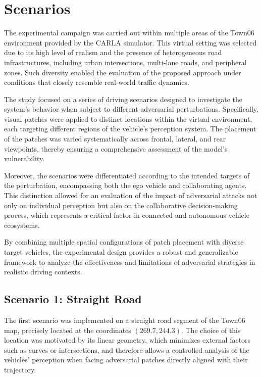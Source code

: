 \section{Scenarios}

The experimental campaign was carried out within multiple areas of the Town06 environment provided by the CARLA simulator.  
This virtual setting was selected due to its high level of realism and the presence of heterogeneous road infrastructures, including urban intersections, multi-lane roads, and peripheral zones. Such diversity enabled the evaluation of the proposed approach under conditions that closely resemble real-world traffic dynamics.

The study focused on a series of driving scenarios designed to investigate the system’s behavior when subject to different adversarial perturbations. Specifically, visual patches were applied to distinct locations within the virtual environment, each targeting different regions of the vehicle’s perception system. The placement of the patches was varied systematically across frontal, lateral, and rear viewpoints, thereby ensuring a comprehensive assessment of the model’s vulnerability.

Moreover, the scenarios were differentiated according to the intended targets of the perturbation, encompassing both the ego vehicle and collaborating agents. This distinction allowed for an evaluation of the impact of adversarial attacks not only on individual perception but also on the collaborative decision-making process, which represents a critical factor in connected and autonomous vehicle ecosystems.

By combining multiple spatial configurations of patch placement with diverse target vehicles, the experimental design provides a robust and generalizable framework to analyze the effectiveness and limitations of adversarial strategies in realistic driving contexts.

\subsection{Scenario 1: Straight Road}

The first scenario was implemented on a straight road segment of the Town06 map, precisely located at the coordinates $(269.7, 244.3)$.  
The choice of this location was motivated by its linear geometry, which minimizes external factors such as curves or intersections, and therefore allows a controlled analysis of the vehicles’ perception when facing adversarial patches directly aligned with their trajectory.

